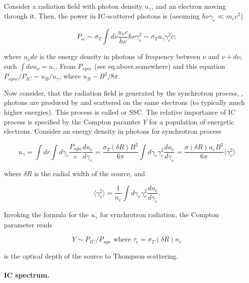 Consider a radiation field with photon density $u_{\gamma}$, and an electron moving through it. 
Then, the power in \ac{IC}-scattered photons is (assuming $h\nu\gamma_e\ll m_e c^2$)

\begin{equation}
P_{ic} \sim \sigma_T \int d\nu \frac{u_{\nu} c}{h\nu} h\nu\gamma_e^2 \sim \sigma_T u_{\gamma}\gamma^2_e c;
\end{equation}

where $u_{\nu}d\nu$ is the energy density in photons of frequency between $\nu$ and $\nu+d\nu$, such $\int d\nu u_{\nu} = u_{\gamma}$. From $P_{sync}$ (see eq.above.somewhere) and this equation $P_{sync}/P_{IC} \sim u_{B}/u_{\gamma}$, where $u_{B}- B^2 / 8\pi$.

Now consider, that the radiation field is generated by the synchrotron process, \ie, photons are produced by and scattered on the same electrons (to typically much higher energies). This process is called  or \ac{SSC}.
The relative importance of \ac{IC} process is specified by the Compton paramter $Y$ for a population of energetic electrons. 
Consider an energy density in photons for synchrotron process

\begin{equation}
u_{\gamma} = \int dr \int d\gamma_e \frac{P_{syn}}{c}\frac{dn_e}{d\gamma_e} = \frac{\sigma_T (\delta R) B^2}{6\pi} \int d\gamma_e \gamma^2_e \frac{d n_e}{d\gamma_e} = \frac{\sigma (\delta R) n_e B^2}{6\pi}\langle\gamma_e^2\rangle
\end{equation}

where $\delta R$ is the radial width of the source, and 

\begin{equation}
\langle \gamma_c^2\rangle = \frac{1}{n_e} \int d\gamma_e \gamma_c^2\frac{dn_e}{d\gamma_e}.
\end{equation}

Invoking the formula  for the $u_{\gamma}$ for synchrotron radiation, the Compton parameter reads 

\begin{equation}
Y \sim P_{IC} / P_{syn} \text{ where } \tau_e = \sigma_T (\delta R) n_e
\end{equation}

is the optical depth of the source to Thompson scattering.

\paragraph{IC spectrum.}


